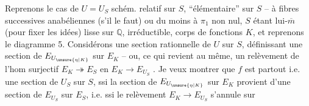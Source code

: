 Reprenons le cas de $U=U_S$ schém. relatif sur $S$, ``élémentaire'' sur $S$ -- à fibres successives anabéliennes (s'il le faut) ou du moins à $\pi_1$ non nul, $S$ étant lui-$\overline m$ (pour fixer les idées) lisse sur $\mathbb{Q}$, irréductible, corps de fonctions $K$, et reprenons le diagramme 5. Considérons une section rationnelle  de $U$ sur $S$, définissant une section de $E_{U_{\unsure{\eta|K}}}$ sur $E_K$ -- ou, ce qui revient au même, un relèvement de l'hom surjectif $E_K\twoheadrightarrow E_S$ en $E_K\longrightarrow E_{U_S}$ . Je veux montrer que $f$ est partout  i.e. une section  de $U_S$ sur $S$, ssi la section de $E_{U_{\unsure{\eta|K}}}$ sur $E_K$ provient d'une section de $E_{U_S}$ sur $E_S$, i.e. ssi le relèvement $E_K\longrightarrow E_{U_S}$ s'annule sur
